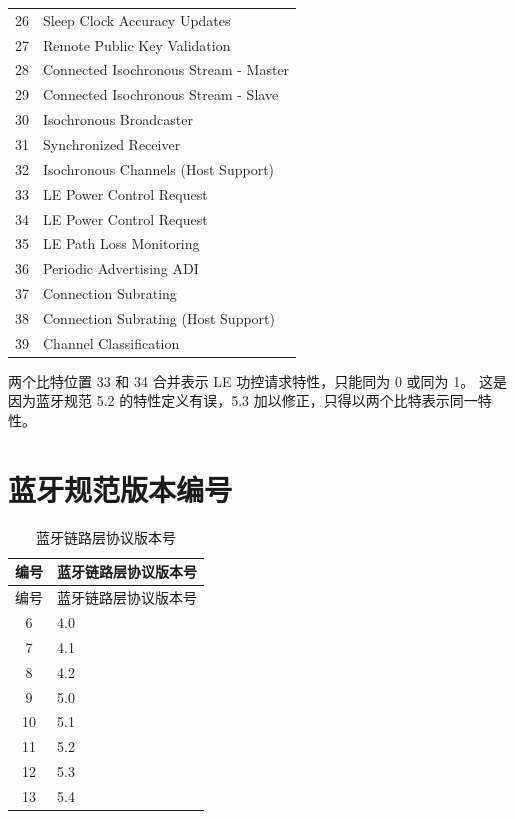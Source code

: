 \documentclass[
  12pt,
]{book}
\makeatletter
\newenvironment{kframe}{%
\medskip{}
\setlength{\fboxsep}{.8em}
 \def\at@end@of@kframe{}%
 \ifinner\ifhmode%
  \def\at@end@of@kframe{\end{minipage}}%
  \begin{minipage}{\columnwidth}%
 \fi\fi%
 \def\FrameCommand##1{\hskip\@totalleftmargin \hskip-\fboxsep
 \colorbox{shadecolor}{##1}\hskip-\fboxsep
     \hskip-\linewidth \hskip-\@totalleftmargin \hskip\columnwidth}%
 \MakeFramed {\advance\hsize-\width
   \@totalleftmargin\z@ \linewidth\hsize
   \@setminipage}}%
 {\par\unskip\endMakeFramed%
 \at@end@of@kframe}
\newenvironment{rmdblock}[1]
  {
  \begin{itemize}
  \renewcommand{\labelitemi}{
    \raisebox{-.7\height}[0pt][0pt]{
      {\setkeys{Gin}{width=3em,keepaspectratio}\texttt{[image: images/\#1]}}
    }
  }
  \setlength{\fboxsep}{1em}
  \begin{kframe}
  \item
  }
  {
  \end{kframe}
  \end{itemize}
  }
\newenvironment{rmdnote}
  {\begin{rmdblock}{note}}
  {\end{rmdblock}}
\makeatother
\begin{document}
\begin{longtable}[]{@{}cl@{}}
26 & Sleep Clock Accuracy Updates \\
27 & Remote Public Key Validation \\
28 & Connected Isochronous Stream - Master \\
29 & Connected Isochronous Stream - Slave \\
30 & Isochronous Broadcaster \\
31 & Synchronized Receiver \\
32 & Isochronous Channels (Host Support) \\
33 & LE Power Control Request \\
34 & LE Power Control Request \\
35 & LE Path Loss Monitoring \\
36 & Periodic Advertising ADI \\
37 & Connection Subrating \\
38 & Connection Subrating (Host Support) \\
39 & Channel Classification \\
\bottomrule()
\end{longtable}

\begin{rmdnote}
两个比特位置 33 和 34 合并表示 LE 功控请求特性，只能同为 0 或同为 1。
这是因为蓝牙规范 5.2 的特性定义有误，5.3
加以修正，只得以两个比特表示同一特性。
\end{rmdnote}

\hypertarget{ux84ddux7259ux89c4ux8303ux7248ux672cux7f16ux53f7}{%
\section{蓝牙规范版本编号}\label{ux84ddux7259ux89c4ux8303ux7248ux672cux7f16ux53f7}}

\begin{longtable}[]{@{}cl@{}}
\caption{\label{tab:ch-overview-ble-version} 蓝牙链路层协议版本号}\tabularnewline
\toprule()
编号 & 蓝牙链路层协议版本号 \\
\midrule()
\endfirsthead
\toprule()
编号 & 蓝牙链路层协议版本号 \\
\midrule()
\endhead
6 & 4.0 \\
7 & 4.1 \\
8 & 4.2 \\
9 & 5.0 \\
10 & 5.1 \\
11 & 5.2 \\
12 & 5.3 \\
13 & 5.4 \\
\bottomrule()
\end{longtable}
\end{document}
